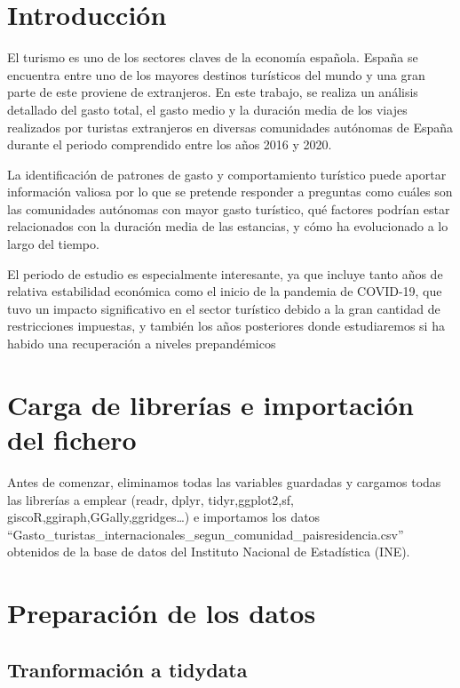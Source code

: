 \documentclass[data,article,submit,moreauthors,pdftex]{Definitions/mdpi}
\begin{document}

\section{Introducción}\label{introducciuxf3n}

El turismo es uno de los sectores claves de la economía española. España
se encuentra entre uno de los mayores destinos turísticos del mundo y
una gran parte de este proviene de extranjeros. En este trabajo, se
realiza un análisis detallado del gasto total, el gasto medio y la
duración media de los viajes realizados por turistas extranjeros en
diversas comunidades autónomas de España durante el periodo comprendido
entre los años 2016 y 2020.

La identificación de patrones de gasto y comportamiento turístico puede
aportar información valiosa por lo que se pretende responder a preguntas
como cuáles son las comunidades autónomas con mayor gasto turístico, qué
factores podrían estar relacionados con la duración media de las
estancias, y cómo ha evolucionado a lo largo del tiempo.

El periodo de estudio es especialmente interesante, ya que incluye tanto
años de relativa estabilidad económica como el inicio de la pandemia de
COVID-19, que tuvo un impacto significativo en el sector turístico
debido a la gran cantidad de restricciones impuestas, y también los años
posteriores donde estudiaremos si ha habido una recuperación a niveles
prepandémicos

\section{Carga de librerías e importación del
fichero}\label{carga-de-libreruxedas-e-importaciuxf3n-del-fichero}

Antes de comenzar, eliminamos todas las variables guardadas y cargamos
todas las librerías a emplear (readr, dplyr, tidyr,ggplot2,sf,
giscoR,ggiraph,GGally,ggridges\ldots) e importamos los datos
``Gasto\_turistas\_internacionales\_segun\_comunidad\_paisresidencia.csv''
obtenidos de la base de datos del Instituto Nacional de Estadística
(INE).

\section{Preparación de los datos}\label{preparaciuxf3n-de-los-datos}

\subsection{Tranformación a tidydata}\label{tranformaciuxf3n-a-tidydata}
\end{document}
